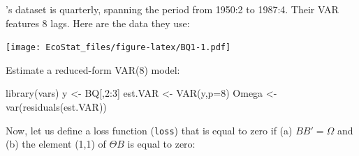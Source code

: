 \documentclass[
  12pt,
]{book}
\newenvironment{Shaded}{\begin{snugshade}}{\end{snugshade}}
\newcommand{\AttributeTok}[1]{\textcolor[rgb]{0.77,0.63,0.00}{#1}}
\newcommand{\DecValTok}[1]{\textcolor[rgb]{0.00,0.00,0.81}{#1}}
\newcommand{\FunctionTok}[1]{\textcolor[rgb]{0.00,0.00,0.00}{#1}}
\newcommand{\NormalTok}[1]{#1}
\newcommand{\OtherTok}[1]{\textcolor[rgb]{0.56,0.35,0.01}{#1}}
\newcommand{\SpecialCharTok}[1]{\textcolor[rgb]{0.00,0.00,0.00}{#1}}
\newcommand{\StringTok}[1]{\textcolor[rgb]{0.31,0.60,0.02}{#1}}
\theoremstyle{definition}
\theoremstyle{definition}
\theoremstyle{definition}
\theoremstyle{definition}
\theoremstyle{remark}
\begin{document}
\citet{Blanchard_Quah_1989}'s dataset is quarterly, spanning the period from 1950:2 to 1987:4. Their VAR features 8 lags. Here are the data they use:

\begin{Shaded}
\end{Shaded}

\texttt{[image: EcoStat\_files/figure-latex/BQ1-1.pdf]}

Estimate a reduced-form VAR(8) model:

\begin{Shaded}
\begin{Highlighting}[]
\FunctionTok{library}\NormalTok{(vars)}
\NormalTok{y }\OtherTok{\textless{}{-}}\NormalTok{ BQ[,}\DecValTok{2}\SpecialCharTok{:}\DecValTok{3}\NormalTok{]}
\NormalTok{est.VAR }\OtherTok{\textless{}{-}} \FunctionTok{VAR}\NormalTok{(y,}\AttributeTok{p=}\DecValTok{8}\NormalTok{)}
\NormalTok{Omega }\OtherTok{\textless{}{-}} \FunctionTok{var}\NormalTok{(}\FunctionTok{residuals}\NormalTok{(est.VAR))}
\end{Highlighting}
\end{Shaded}

Now, let us define a loss function (\texttt{loss}) that is equal to zero if (a) \(BB'=\Omega\) and (b) the element (1,1) of \(\Theta B\) is equal to zero:
\end{document}
